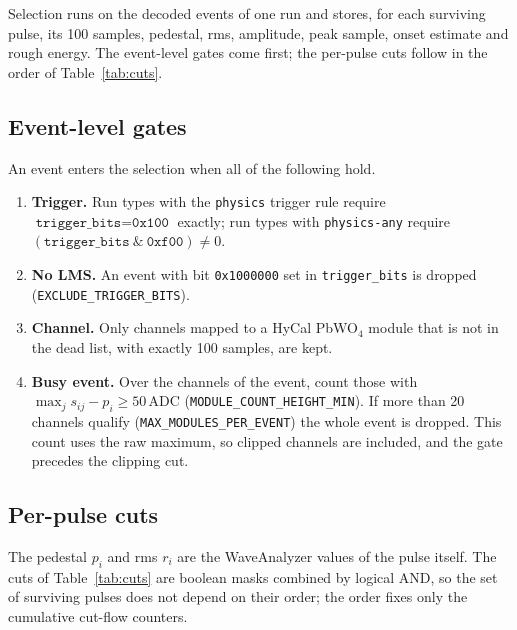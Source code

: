 \documentclass[11pt]{article}
\newcommand{\adc}{\,\mathrm{ADC}}
\newcommand{\code}[1]{\texttt{#1}}
\begin{document}
Selection runs on the decoded events of one run and stores, for each surviving pulse, its 100 samples, pedestal, rms, amplitude, peak sample, onset estimate and rough energy. The event-level gates come first; the per-pulse cuts follow in the order of Table~\ref{tab:cuts}.

\subsection{Event-level gates}

An event enters the selection when all of the following hold.
\begin{enumerate}
\item \textbf{Trigger.} Run types with the \code{physics} trigger rule require $\code{trigger\_bits} = \code{0x100}$ exactly; run types with \code{physics-any} require $(\code{trigger\_bits}\ \&\ \code{0xf00}) \neq 0$.
\item \textbf{No LMS.} An event with bit \code{0x1000000} set in \code{trigger\_bits} is dropped (\code{EXCLUDE\_TRIGGER\_BITS}).
\item \textbf{Channel.} Only channels mapped to a HyCal PbWO$_4$ module that is not in the dead list, with exactly 100 samples, are kept.
\item \textbf{Busy event.} Over the channels of the event, count those with $\max_j s_{ij} - p_i \ge 50\adc$ (\code{MODULE\_COUNT\_HEIGHT\_MIN}). If more than 20 channels qualify (\code{MAX\_MODULES\_PER\_EVENT}) the whole event is dropped. This count uses the raw maximum, so clipped channels are included, and the gate precedes the clipping cut.
\end{enumerate}

\subsection{Per-pulse cuts}

The pedestal $p_i$ and rms $r_i$ are the WaveAnalyzer values of the pulse itself. The cuts of Table~\ref{tab:cuts} are boolean masks combined by logical AND, so the set of surviving pulses does not depend on their order; the order fixes only the cumulative cut-flow counters.
\end{document}

